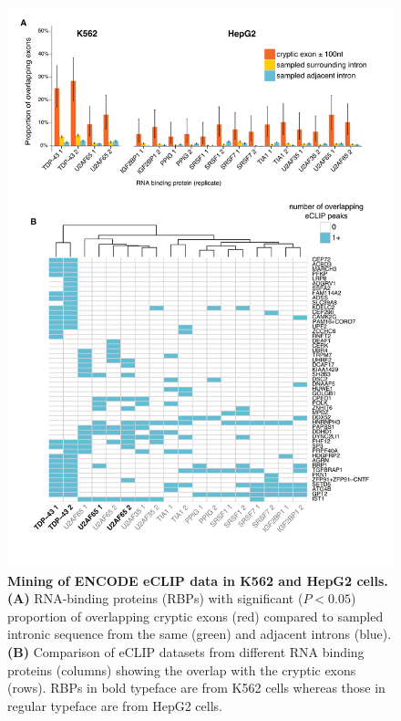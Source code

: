 \begin{figure}[h!]
	\centering
	\includegraphics[width=\textwidth]{Figures/03_cryptic_exons/Figure_7_ENCODE_mining.png}
	\caption[Mining of ENCODE eCLIP data in K562 and HepG2 cells]{
		\textbf{Mining of ENCODE eCLIP data in K562 and HepG2 cells.}
	\textbf{(A)} RNA-binding proteins (RBPs) with significant ($P < 0.05$) proportion of overlapping cryptic exons (red) compared to sampled intronic sequence from the same (green) and adjacent introns (blue). 
	\textbf{(B)} Comparison of eCLIP datasets from different RNA binding proteins (columns) showing the overlap with the cryptic exons (rows). RBPs in bold typeface are from K562 cells whereas those in regular typeface are from HepG2 cells.
}
	\label{fig:cryptic_mining}
\end{figure}

